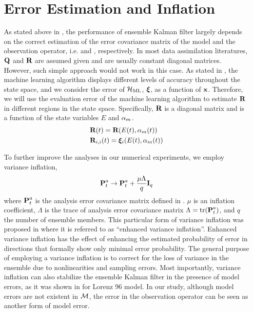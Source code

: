 \section{Error Estimation and Inflation}\label{sec:inflation}
\par As stated above in , the performance of ensemble Kalman filter largely depends on the correct estimation of the error covariance matrix of the model and the observation operator, i.e. {\mQ} and {\mR}, respectively. In most data assimilation literatures, $\textbf{Q}$ and $\textbf{R}$ are assumed given and are usually constant diagonal matrices. However, such simple approach would not work in this case. As stated in , the machine learning algorithm displays different levels of accuracy throughout the state space, and we consider the error of $\mathcal{H}_{\text{ML}}$, $\bm{\xi}$, as a function of $\textbf{x}$. Therefore, we will use the evaluation error of the machine learning algorithm to estimate $\textbf{R}$ in different regions in the state space. Specifically, $\textbf{R}$ is a diagonal matrix and is a function of the state variables $E$ and $\alpha_m$.
\begin{align}
& \textbf{R}(t)=\textbf{R}(E(t),\alpha_m(t)) \\
& \textbf{R}_{i,i}(t) = \bm{\xi}_i(E(t),\alpha_m(t)) \label{Rt}
\end{align}

\par To further improve the analyses in our numerical experiments, we employ variance inflation,
\begin{equation} \label{inflation}
\textbf{P}_t^a\rightarrow \textbf{P}_t^a+\frac{\mu\Lambda}{q}\textbf{I}_q
\end{equation}
where $\textbf{P}_t^a$ is the analysis error covariance matrix defined in . $\mu$ is an inflation coefficient, $\Lambda$ is the trace of analysis error covariance matrix $\Lambda = \text{tr}(\textbf{P}_t^a)$, and $q$ the number of ensemble members. This particular form of variance inflation was proposed in \cite{Inflation} where it is referred to as ``enhanced variance inflation''. Enhanced variance inflation has the effect of enhancing the estimated probability of error in directions that formally show only minimal error probability. The general purpose of employing a variance inflation is to correct for the loss of variance in the ensemble due to nonlinearities and sampling errors. Most importantly, variance inflation can also stabilize the ensemble Kalman filter in the presence of model errors, as it was shown in \cite{Baek06} for Lorenz 96 model. In our study, although model errors are not existent in $\mathcal{M}$, the error in the observation operator can be seen as another form of model error.

